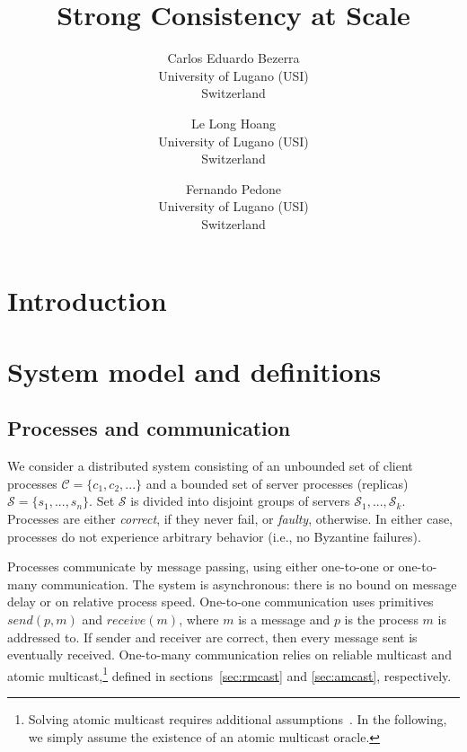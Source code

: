 \documentclass[11pt]{article}
\newcommand{\ccm}{\mathcal{C}}
\newcommand{\ssm}{\mathcal{S}}
\begin{document}
\title{Strong Consistency at Scale}
 
\author{
  Carlos Eduardo Bezerra\\
  University of Lugano (USI)\\
  Switzerland
  \and
  Le Long Hoang\\
  University of Lugano (USI)\\
  Switzerland
  \and
  Fernando Pedone\\
  University of Lugano (USI)\\
  Switzerland
}

\begin{abstract}
\end{abstract}

\maketitle

\section{Introduction}

\clearpage
\section{System model and definitions}
\label{sec:sysmodel}

\subsection{Processes and communication}

We consider a distributed system consisting of an unbounded set of client processes $\ccm = \{c_1, c_2, ...\}$ and a bounded set of server processes (replicas) $\ssm = \{s_1, ..., s_n\}$. 
Set $\ssm$ is divided into disjoint groups of servers $\ssm_1, ..., \ssm_k$.
Processes are either \emph{correct}, if they never fail, or \emph{faulty}, otherwise. 
In either case, processes do not experience arbitrary behavior (i.e., no Byzantine failures).

Processes communicate by message passing, using either one-to-one or one-to-many communication.
The system is asynchronous: there is no bound on message delay or on relative process speed.
One-to-one communication uses primitives $send(p,m)$ and $receive(m)$, where $m$ is a message and $p$ is the process $m$ is addressed to. 
If sender and receiver are correct, then every message sent is eventually received. 
%
One-to-many communication relies on reliable multicast and atomic multicast,\footnote{Solving atomic multicast requires additional assumptions~\cite{CT96,FLP85}. In the following, we simply assume the existence of an atomic multicast oracle.}
defined in sections~\ref{sec:rmcast} and \ref{sec:amcast}, respectively.
\end{document}
